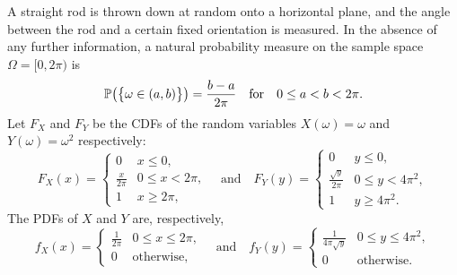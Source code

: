 %
%

\begin{example}
A straight rod is thrown down at random onto a horizontal plane, and the angle between the rod and a certain fixed orientation is measured. In the absence of any further information, a natural probability measure on the sample space $\Omega = [0,2\pi)$ is
\[
\mathbb{P}\big(\big\{\omega\in(a,b)\big\}\big)=\frac{b-a}{2\pi} \quad\text{for}\quad 0\leq a < b < 2\pi.
\]
Let $F_X$ and $F_Y$ be the CDFs of the random variables $X(\omega)=\omega$ and $Y(\omega)=\omega^2$ respectively:
\[
F_X(x) = \begin{cases}
	0				& x \leq 0, \\[2ex]
	\displaystyle\frac{x}{2\pi}	& 0 \leq x < 2\pi, \\[2ex]
	1				& x \geq 2\pi,
\end{cases}
\quad\text{and}\quad
F_Y(y) = \begin{cases}
	0						& y \leq 0, \\[2ex]
	\displaystyle\frac{\sqrt{y}}{2\pi}	& 0 \leq y < 4\pi^2, \\[2ex]
	1						& y \geq 4\pi^2.
\end{cases}
\]
The PDFs of $X$ and $Y$ are, respectively,
\[
f_X(x)=\begin{cases}
\displaystyle\frac{1}{2\pi}	& 0\leq x\leq 2\pi, \\[2ex]
0							& \text{otherwise},
\end{cases}
\quad\text{and}\quad
f_Y(y)=\begin{cases}
\displaystyle\frac{1}{4\pi\sqrt{y}}	& 0\leq y\leq 4\pi^2, \\[2ex]
0									& \text{otherwise}.
\end{cases}
\]
\end{example}



